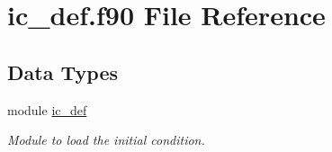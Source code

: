 \hypertarget{ic__def_8f90}{\section{ic\-\_\-def.\-f90 File Reference}
\label{ic__def_8f90}
}
\subsection*{Data Types}
\begin{DoxyCompactItemize}
\item 
module \hyperlink{classic__def}{ic\-\_\-def}
\begin{DoxyCompactList}\small\item\em Module to load the initial condition. \end{DoxyCompactList}\end{DoxyCompactItemize}
